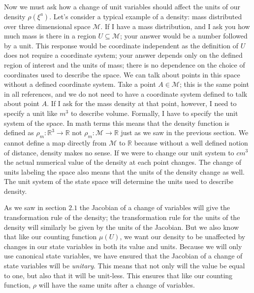 \documentclass{article}[a4paper]
\begin{document}
	Now we must ask how a change of unit variables should affect the units of our density $\rho(\xi^a)$. Let's consider a typical example of a density: mass distributed over three dimensional space $\mathcal{M}$. If I have a mass distribution, and I ask you how much mass is there in a region $U \subseteq \mathcal{M}$; your answer would be a number followed by a unit. This response would be coordinate independent as the definition of $U$ does not require a coordinate system; your answer depends only on the defined region of interest and the units of mass; there is no dependence on the choice of coordinates used to describe the space. We can talk about points in this space without a defined coordinate system. Take a point $A \in \mathcal{M}$; this is the same point in all references, and we do not need to have a coordinate system defined to talk about point $A$. If I ask for the mass density at that point, however, I need to specify a unit like $m^3$ to describe volume. Formally, I have to specify the unit system of the space. In math terms this means that the density function is defined as $\rho_m : \mathbb{R}^3 \to \mathbb{R}$ not $\rho_m : \mathcal{M} \to \mathbb{R}$ just as we saw in the previous section. We cannot define a map directly from $\mathcal{M}$ to $\mathbb{R}$ because without a well defined notion of distance, density makes no sense. If we were to change our unit system to $cm^3$ the actual numerical value of the density at each point changes. The change of units labeling the space also means that the units of the density change as well. The unit system of the state space will determine the units used to describe density. 
	
	As we saw in section $2.1$ the Jacobian of a change of variables will give the transformation rule of the density; the transformation rule for the units of the density will similarly be given by the units of the Jacobian. But we also know that like our counting function $\mu(U)$, we want our density to be unaffected by changes in our state variables in both its value and units. Because we will only use canonical state variables, we have ensured that the Jacobian of a change of state variables will be \textit{unitary}. This means that not only will the value be equal to one, but also that it will be unit-less. This ensures that like our counting function, $\rho$ will have the same units after a change of variables. 
	
	 
\end{document}
